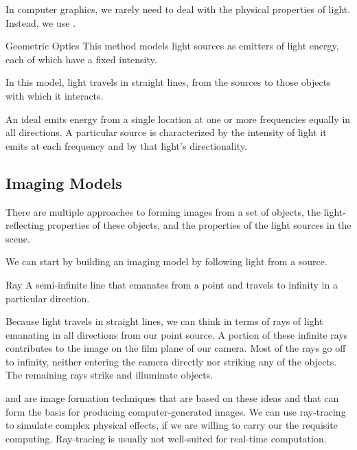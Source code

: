 \documentclass[\main/notes.tex]{subfiles}
\begin{document}
        In computer graphics, we rarely need to deal with the physical properties of light.
        Instead, we use .

        \begin{definition}{Geometric Optics}
          This method models light sources as emitters of light energy,
          each of which have a fixed intensity.

          In this model, light travels in straight lines,
          from the sources to those objects with which it interacts.
        \end{definition}

        An ideal  emits energy from a single location
        at one or more frequencies equally in all directions.
        A particular source is characterized by the
        intensity of light it emits at each frequency and
        by that light's directionality.

      \subsection{Imaging Models}
        There are multiple approaches to forming images from a set of objects,
        the light-reflecting properties of these objects, and
        the properties of the light sources in the scene.

        We can start by building an imaging model by following light from a source.

        \begin{definition}{Ray}
          A semi-infinite line that emanates from a point and
          travels to infinity in a particular direction.
        \end{definition}

        Because light travels in straight lines, we can think in terms of rays of light
        emanating in all directions from our point source.
        A portion of these infinite rays contributes to the image on the film plane of our camera.
        Most of the rays go off to infinity, neither entering the camera directly nor striking any
        of the objects.
        The remaining rays strike and illuminate objects.

         and  are image formation techniques
        that are based on these ideas and that can form the basis for producing computer-generated
        images.
        We can use ray-tracing to simulate complex physical effects,
        if we are willing to carry our the requisite computing.
        Ray-tracing is usually not well-suited for real-time computation.
\end{document}
